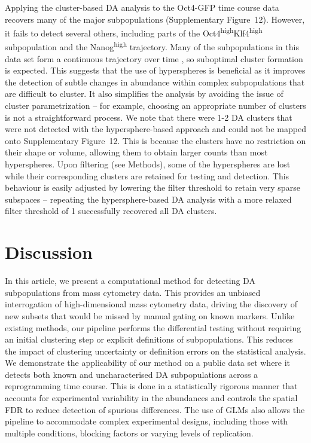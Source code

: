 \documentclass{article}
\newcommand{\suppfigclusterreal}{12}
\begin{document}
Applying the cluster-based DA analysis to the Oct4-GFP time course data recovers many of the major subpopulations (Supplementary Figure~\suppfigclusterreal{}).
However, it fails to detect several others, including parts of the Oct4\textsuperscript{high}Klf4\textsuperscript{high} subpopulation and the Nanog\textsuperscript{high} trajectory.
Many of the subpopulations in this data set form a continuous trajectory over time \cite{zunder2015continuous}, so suboptimal cluster formation is expected.
This suggests that the use of hyperspheres is beneficial as it improves the detection of subtle changes in abundance within complex subpopulations that are difficult to cluster.
It also simplifies the analysis by avoiding the issue of cluster parametrization -- for example, choosing an appropriate number of clusters is not a straightforward process.
We note that there were 1-2 DA clusters that were not detected with the hypersphere-based approach and could not be mapped onto Supplementary Figure~\suppfigclusterreal{}.
This is because the clusters have no restriction on their shape or volume, allowing them to obtain larger counts than most hyperspheres.
Upon filtering (see Methods), some of the hyperspheres are lost while their corresponding clusters are retained for testing and detection.
This behaviour is easily adjusted by lowering the filter threshold to retain very sparse subspaces -- repeating the hypersphere-based DA analysis with a more relaxed filter threshold of 1 successfully recovered all DA clusters.

\section{Discussion}
In this article, we present a computational method for detecting DA subpopulations from mass cytometry data.
This provides an unbiased interrogation of high-dimensional mass cytometry data, driving the discovery of new subsets that would be missed by manual gating on known markers.
Unlike existing methods, our pipeline performs the differential testing without requiring an initial clustering step or explicit definitions of subpopulations.
This reduces the impact of clustering uncertainty or definition errors on the statistical analysis.
We demonstrate the applicability of our method on a public data set where it detects both known and uncharacterised DA subpopulations across a reprogramming time course.
This is done in a statistically rigorous manner that accounts for experimental variability in the abundances and controls the spatial FDR to reduce detection of spurious differences.
The use of GLMs also allows the pipeline to accommodate complex experimental designs, including those with multiple conditions, blocking factors or varying levels of replication.
\end{document}
